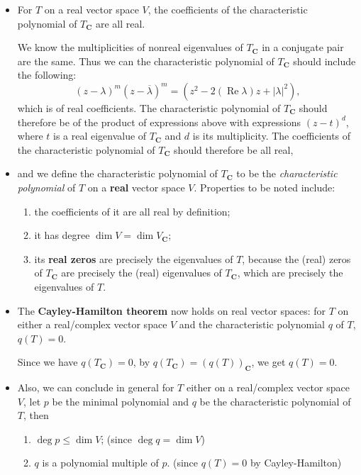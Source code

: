 \documentclass[11pt]{article}
\newcommand{\df}[1]{\textit{\textsf{#1}}}
\newcommand{\C}{\mathbf{C}}
\renewcommand{\Re}{\operatorname{Re}}
\renewcommand{\d}{\dim}
\newcommand{\conj}[1]{\overline{#1}}
\newcommand{\abs}[1]{\lvert #1 \rvert}
\begin{document}
\begin{itemize}
    \item For $T$ on a real vector space $V$, the coefficients of the characteristic polynomial of $T_\C$ are all real.

    We know the multiplicities of nonreal eigenvalues of $T_\C$ in a conjugate pair are the same. Thus we can the characteristic polynomial of $T_\C$ should include the following: \[(z-\lambda)^m(z-\conj{\lambda})^m = (z^2 - 2(\Re \lambda)z + \abs{\lambda}^2),\] which is of real coefficients. The characteristic polynomial of $T_\C$ should therefore be of the product of expressions above with expressions $(z-t)^d$, where $t$ is a real eigenvalue of $T_\C$ and $d$ is its multiplicity. The coefficients of the characteristic polynomial of $T_\C$ should therefore be all real,
    \item and we define the characteristic polynomial of $T_\C$ to be the \df{characteristic polynomial} of $T$ on a \textbf{real} vector space $V$. Properties to be noted include:
    \begin{enumerate}[label=(\alph*)]
        \item the coefficients of it are all real by definition;
        \item it has degree $\d V = \d V_\C$;
        \item its \textbf{real zeros} are precisely the eigenvalues of $T$, because the (real) zeros of $T_\C$ are precisely the (real) eigenvalues of $T_\C$, which are precisely the eigenvalues of $T$.
    \end{enumerate}
    \item The \textbf{Cayley-Hamilton theorem} now holds on real vector spaces: for $T$ on either a real/complex vector space $V$ and the characteristic polynomial $q$ of $T$, $q(T) = 0$.
    
    Since we have $q(T_\C) = 0$, by $q(T_\C) = (q(T))_\C$, we get $q(T) = 0$.
    \item Also, we can conclude in general for $T$ either on a real/complex vector space $V$, let $p$ be the minimal polynomial and $q$ be the characteristic polynomial of $T$, then
    \begin{enumerate}[label=(\alph*)]
        \item $\deg p \leq \d V$; (since $\deg q = \d V$)
        \item $q$ is a polynomial multiple of $p$. (since $q(T) = 0$ by Cayley-Hamilton)
    \end{enumerate}
\end{itemize}
\end{document}
